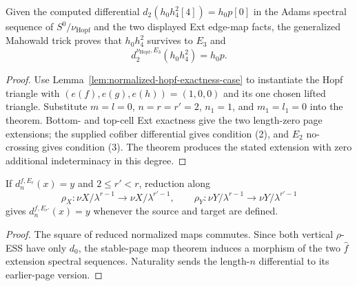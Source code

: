 \begin{proposition}
  \label{prop:mahowald-cofiber-regression}
  \notready
  Given the computed differential
  $d_2(h_0h_4^2[4])=h_0p[0]$ in the Adams spectral sequence of
  $S^0/\nu_{\mathrm{Hopf}}$ and the two displayed Ext edge-map facts, the
  generalized Mahowald trick proves that $h_0h_4^2$ survives to $E_3$ and
  \[
    d_2^{\nu_{\mathrm{Hopf}},E_3}(h_0h_4^2)=h_0p.
  \]
\end{proposition}

\begin{proof}
  Use Lemma~\ref{lem:normalized-hopf-exactness-case} to instantiate the Hopf
  triangle with $(e(f),e(g),e(h))=(1,0,0)$ and its one chosen lifted triangle.
  Substitute $m=l=0$, $n=r=r'=2$, $n_1=1$, and $m_1=l_1=0$ into the theorem.
  Bottom- and top-cell Ext exactness give the two length-zero page extensions;
  the supplied cofiber differential gives condition (2), and $E_2$
  no-crossing gives condition (3).  The theorem produces the stated
  extension with zero additional indeterminacy in this degree.
\end{proof}

\begin{proposition}
  \label{prop:page-extension-restrict}
  \notready
  If $d_n^{f,E_r}(x)=y$ and $2\le r'<r$, reduction along
  \[
    \rho_X:\nu X/\lambda^{r-1}\to\nu X/\lambda^{r'-1},
    \qquad
    \rho_Y:\nu Y/\lambda^{r-1}\to\nu Y/\lambda^{r'-1}
  \]
  gives
  $d_n^{f,E_{r'}}(x)=y$ whenever the source and target are defined.
\end{proposition}

\begin{proof}
  The square of reduced normalized maps commutes.  Since both vertical
  $\rho$-ESS have only $d_0$, the stable-page map theorem induces a morphism of
  the two $\widehat f$ extension spectral sequences.  Naturality sends the
  length-$n$ differential to its earlier-page version.
\end{proof}

